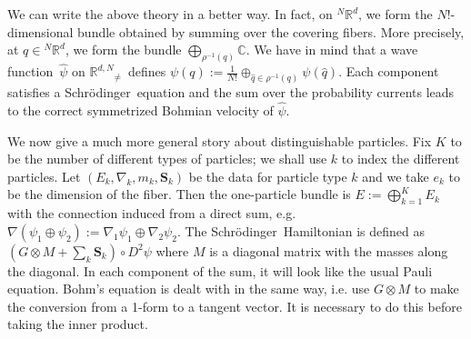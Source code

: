 \documentclass[11pt]{article}
\theoremstyle{remark}
\begin{document}
We can write the above theory in a better way. In fact, on \ensuremath{{}^N\ensuremath{\mathbb{R}^{\ensuremath{d}}}}, we
form the $N!$-dimensional bundle obtained by summing over the 
covering fibers. More precisely, at $\ensuremath{q} \in \ensuremath{{}^N\ensuremath{\mathbb{R}^{\ensuremath{d}}}}$, we form the
bundle $\bigoplus_{\ensuremath{\ensuremath{\rho}}^{-1}(\ensuremath{q})} \ensuremath{\mathbb{C}}$. We have in mind that a
wave function\ $\hat{\ensuremath{\psi}}$ on \ensuremath{\ensuremath{\mathbb{R}^{d,N}}_{\neq}}\ defines $\ensuremath{\psi}(\ensuremath{q}) \ensuremath{:=}
 \frac{1}{N!} \oplus_{\ensuremath{\hat{q}} \in \ensuremath{\ensuremath{\rho}}^{-1}(\ensuremath{q})} \ensuremath{\psi}(\ensuremath{\hat{q}})$.  
Each component satisfies a Schr\"odinger\ equation and the sum over the
probability currents leads to the correct symmetrized Bohmian velocity of
$\hat{\ensuremath{\psi}}$. 

We now give a much more general story about distinguishable
particles. 
Fix $K$ to be the number of different types of particles; we shall use
$k$ to index the different particles.  Let
$(E_k, \nabla_k, m_k, \ensuremath{\boldsymbol{S}}_k)$ be the data for particle type
$k$ and we take $e_k$ to be the dimension of the fiber. 
Then the one-particle bundle is $E \ensuremath{:=} \bigoplus_{k=1}^K E_k$ with
the connection induced from a direct sum, e.g.\ $\nabla (\ensuremath{\psi}_1 \oplus
\ensuremath{\psi}_2) \ensuremath{:=} \nabla_1 \ensuremath{\psi}_1 \oplus \nabla_2 \ensuremath{\psi}_2$. The Schr\"odinger\
Hamiltonian is defined as $(G\otimes M + \sum_k \ensuremath{\boldsymbol{S}}_k ) \circ D^2 \ensuremath{\psi}$
where $M$ is a diagonal matrix with the masses along the
diagonal. In each component of the sum, it will look like the usual Pauli
equation. Bohm's equation is dealt with in the same way, i.e. use $G
\otimes M$ to make the conversion from a 1-form to a tangent vector. 
It is necessary to do this before taking the
inner product. 
\end{document}
